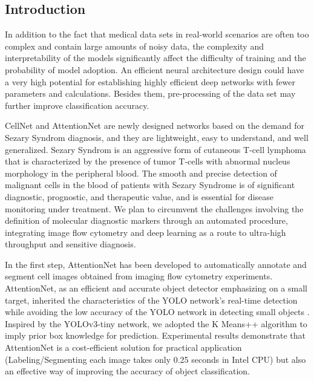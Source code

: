 \subsection{Introduction}
\label{sec:Introduction}
In addition to the fact that medical data sets in real-world scenarios are often too complex and contain large amounts of noisy data, the complexity and interpretability of the models significantly affect the difficulty of training and the probability of model adoption.
An efficient neural architecture design could have a very high potential for establishing highly efficient deep networks with fewer parameters and calculations\cite{19}. Besides them, pre-processing of the data set may further improve classification accuracy.
 
CellNet and AttentionNet are newly designed networks based on the demand for Sezary Syndrom diagnosis, and they are lightweight, easy to understand, and well generalized. Sezary Syndrom is an aggressive form of cutaneous T-cell lymphoma that is characterized by the presence of tumor T-cells with abnormal nucleus morphology in the peripheral blood. The smooth and precise detection of malignant cells in the blood of patients with Sezary Syndrome is of significant diagnostic, prognostic, and therapeutic value, and is essential for disease monitoring under treatment\cite{6}\cite{7}. We plan to circumvent the challenges involving the definition of molecular diagnostic markers through an automated procedure, integrating image flow cytometry and deep learning as a route to ultra-high throughput and sensitive diagnosis.

In the first step, AttentionNet has been developed to automatically annotate and segment cell images obtained from imaging flow cytometry experiments. AttentionNet, as an efficient and accurate object detector emphasizing on a small target, inherited the characteristics of the YOLO network's real-time detection while avoiding the low accuracy of the YOLO network in detecting small objects \cite{33}. Inspired by the YOLOv3-tiny network\cite{18}, we adopted the K Means++ algorithm to imply prior box knowledge for prediction. Experimental results demonstrate that AttentionNet is a cost-efficient solution for practical application (Labeling/Segmenting each image takes only 0.25 seconds in Intel CPU) but also an effective way of improving the accuracy of object classification. 

